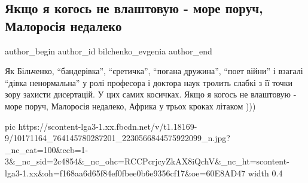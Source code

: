  
 
 
 
 
 
\subsection{Якщо я когось не влаштовую - море поруч, Малоросія недалеко}
\label{sec:23_12_2014.fb.bilchenko_evgenia.1.malorossia}
\ifcmt
 author_begin
   author_id bilchenko_evgenia
 author_end
\fi

Як Більченко, \enquote{бандерівка}, \enquote{єретичка}, \enquote{погана
дружина}, \enquote{поет війни} і взагалі \enquote{дівка ненормальна} у ролі
професора і доктора наук тролить слабкі з її точки зору захисти дисертацій. У
цих самих косичках. Якщо я когось не влаштовую - море поруч, Малоросія
недалеко, Африка у трьох кроках літаком )))

\ifcmt
  pic https://scontent-lga3-1.xx.fbcdn.net/v/t1.18169-9/10171164_764145780287201_2230566844575922099_n.jpg?_nc_cat=100&ccb=1-3&_nc_sid=2c4854&_nc_ohc=RCCPcrjcyZkAX8iQchV&_nc_ht=scontent-lga3-1.xx&oh=f168aa6d65f84ef0fbee0b6e9356cf17&oe=60E8AD47
  width 0.4
\fi

